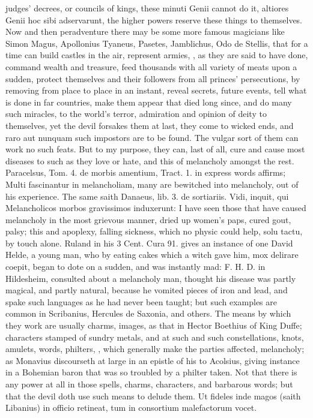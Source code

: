 {judges' decrees, or councils of kings, these minuti Genii cannot do it,
altiores Genii hoc sibi adservarunt, the higher powers reserve these
things to themselves. Now and then peradventure there may be some more
famous magicians like Simon Magus, Apollonius Tyaneus, Pasetes,
Jamblichus, Odo de Stellis, that for a time can build castles in
the air, represent armies, \etc{}, as they are said to have done,
command wealth and treasure, feed thousands with all variety of meats
upon a sudden, protect themselves and their followers from all princes'
persecutions, by removing from place to place in an instant, reveal
secrets, future events, tell what is done in far countries, make them
appear that died long since, and do many such miracles, to the world's
terror, admiration and opinion of deity to themselves, yet the devil
forsakes them at last, they come to wicked ends, and raro aut nunquam
such impostors are to be found. The vulgar sort of them can work no
such feats. But to my purpose, they can, last of all, cure and cause
most diseases to such as they love or hate, and this of
melancholy amongst the rest. Paracelsus, Tom. 4. de morbis
amentium, Tract. 1. in express words affirms; Multi fascinantur in
melancholiam, many are bewitched into melancholy, out of his
experience. The same saith Danaeus, lib. 3. de sortiariis. Vidi,
inquit, qui Melancholicos morbos gravissimos induxerunt: I have seen
those that have caused melancholy in the most grievous manner,
dried up women's paps, cured gout, palsy; this and apoplexy,
falling sickness, which no physic could help, solu tactu, by touch
alone. Ruland in his 3 Cent. Cura 91. gives an instance of one David
Helde, a young man, who by eating cakes which a witch gave him, mox
delirare coepit, began to dote on a sudden, and was instantly mad: F.
H. D. in Hildesheim, consulted about a melancholy man, thought
his disease was partly magical, and partly natural, because he vomited
pieces of iron and lead, and spake such languages as he had never been
taught; but such examples are common in Scribanius, Hercules de
Saxonia, and others. The means by which they work are usually charms,
images, as that in Hector Boethius of King Duffe; characters stamped of
sundry metals, and at such and such constellations, knots, amulets,
words, philters, \etc{}, which generally make the parties affected,
melancholy; as Monavius discourseth at large in an epistle of his
to Acolsius, giving instance in a Bohemian baron that was so troubled
by a philter taken. Not that there is any power at all in those spells,
charms, characters, and barbarous words; but that the devil doth use
such means to delude them. Ut fideles inde magos (saith Libanius)
in officio retineat, tum in consortium malefactorum vocet.

}
